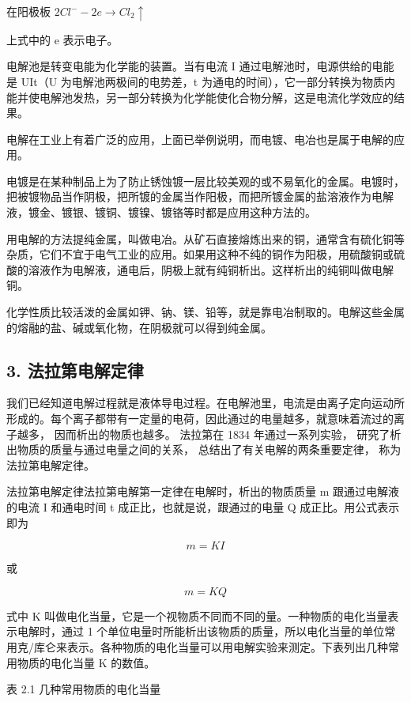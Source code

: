 在阳极板 \(2Cl^{-}-2e\longrightarrow Cl_{2}\uparrow\)

上式中的 e 表示电子。

电解池是转变电能为化学能的装置。当有电流 I
通过电解池时，电源供给的电能是 UIt（U 为电解池两极间的电势差，t
为通电的时间），它一部分转换为物质内能并使电解池发热，另一部分转换为化学能使化合物分解，这是电流化学效应的结果。

电解在工业上有着广泛的应用，上面已举例说明，而电镀、电冶也是属于电解的应用。

电镀是在某种制品上为了防止锈蚀镀一层比较美观的或不易氧化的金属。电镀时，把被镀物品当作阴极，把所镀的金属当作阳极，而把所镀金属的盐溶液作为电解液，镀金、镀银、镀铜、镀镍、镀铬等时都是应用这种方法的。

用电解的方法提纯金属，叫做电冶。从矿石直接熔炼出来的铜，通常含有硫化铜等杂质，它们不宜于电气工业的应用。如果用这种不纯的铜作为阳极，用硫酸铜或硫酸的溶液作为电解液，通电后，阴极上就有纯铜析出。这样析出的纯铜叫做电解铜。

化学性质比较活泼的金属如钾、钠、镁、铅等，就是靠电冶制取的。电解这些金属的熔融的盐、碱或氧化物，在阴极就可以得到纯金属。

\subsection{3.
法拉第电解定律}\label{ux6cd5ux62c9ux7b2cux7535ux89e3ux5b9aux5f8b}

我们已经知道电解过程就是液体导电过程。在电解池里，电流是由离子定向运动所形成的。每个离子都带有一定量的电荷，因此通过的电量越多，就意味着流过的离子越多，
因而析出的物质也越多。 法拉第在 1834 年通过一系列实验，
研究了析出物质的质量与通过电量之间的关系，
总结出了有关电解的两条重要定律， 称为法拉第电解定律。

法拉第电解定律法拉第电解第一定律在电解时，析出的物质质量 m
跟通过电解液的电流 I 和通电时间 t 成正比，也就是说，跟通过的电量 Q
成正比。用公式表示即为

\[
m=KI \tag{2.8}
\]

或

\[
m=KQ \tag{2.9}
\]

式中 K
叫做电化当量，它是一个视物质不同而不同的量。一种物质的电化当量表示电解时，通过
1
个单位电量时所能析出该物质的质量，所以电化当量的单位常用克/库仑来表示。各种物质的电化当量可以用电解实验来测定。下表列出几种常用物质的电化当量
K 的数值。

表 2.1 几种常用物质的电化当量


